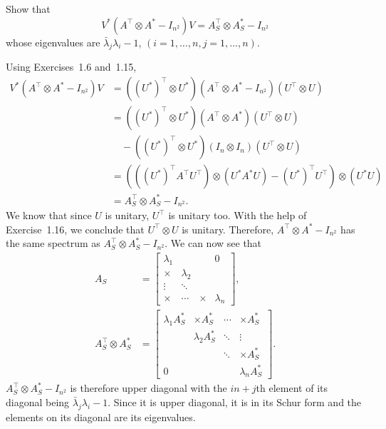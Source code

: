 Show that
\[
V^*(A^\top \otimes A^* - I_{n^2}) V = A_S^\top \otimes A_S^* - I_{n^2}
\]
whose eigenvalues are \(\bar{\lambda}_j \lambda_i - 1\), \((i = 1, \dots, n, j = 1, \dots, n)\).

\begin{solution}
	Using Exercises~1.6 and~1.15,
	\begin{align*}
	V^* (A^\top \otimes A^* - I_{n^2}) V
	& = ((U^*)^\top \otimes U^*) (A^\top \otimes A^* - I_{n^2}) (U^\top \otimes U)\\
	& = ((U^*)^\top \otimes U^*) (A^\top \otimes A^*) (U^\top \otimes U)\\
	& \quad - ((U^*)^\top \otimes U^*) (I_n \otimes I_n) (U^\top \otimes U)\\
	& = (((U^*)^\top A^\top U^\top) \otimes (U^*A^*U) - (U^*)^\top U^\top) \otimes (U^*U)\\
	& = A_S^\top \otimes A_S^* - I_{n^2}.
	\end{align*}
	We know that since $U$ is unitary, $U^\top$ is unitary too.
	With the help of Exercise~1.16, we conclude that $U^\top \otimes U$ is unitary.
	Therefore,
	$A^\top \otimes A^* - I_{n^2}$ has the same spectrum as
	$A_S^\top \otimes A_S^* - I_{n^2}$.
	We can now see that
	\begin{align*}
	A_S & =
	\begin{bmatrix}
	\lambda_1 &           &        & 0\\
	\times    & \lambda_2 &        & \\
	\vdots    & \ddots    &        & \\
	\times    & \cdots    & \times & \lambda_n
	\end{bmatrix},\\
	A_S^\top \otimes A_S^* & =
	\begin{bmatrix}
	\lambda_1 A_S^* & \times A_S^*    & \cdots & \times A_S^*\\
	& \lambda_2 A_S^* & \ddots & \vdots\\
	&                 & \ddots & \times A_S^*\\
	0               &                 &        & \lambda_n A_S^*
	\end{bmatrix}.
	\end{align*}
	$A_S^\top \otimes A_S^* - I_{n^2}$ is therefore
	upper diagonal with the $in + j$th element of its
	diagonal being $\bar{\lambda}_j\lambda_i - 1$.
	Since it is upper diagonal, it is in its Schur form
	and the elements on its diagonal are its eigenvalues.
\end{solution}

